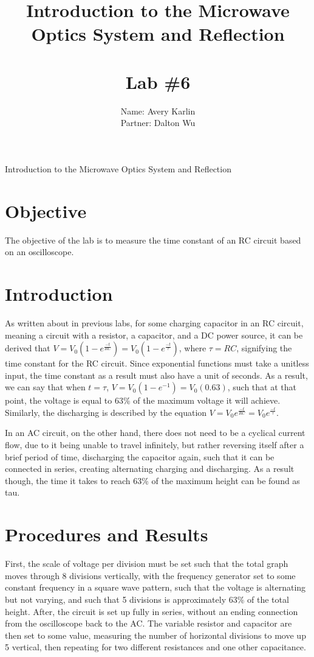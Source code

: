 \documentclass[11pt, titlepage]{article}
\title{Introduction to the Microwave Optics System and Reflection \\ \ \\ \large Lab \#6}
\author{Name: Avery Karlin \\ Partner: Dalton Wu}
\date{}
\begin{document}
\maketitle

\begin{center}
\LARGE Introduction to the Microwave Optics System and Reflection
\end{center}

\section*{Objective}
The objective of the lab is to measure the time constant of an RC circuit based on an oscilloscope.

\section*{Introduction}
As written about in previous labs, for some charging capacitor in an RC circuit, meaning a circuit with a resistor, a capacitor, and a DC power source, it can be derived that $V = V_0(1 - e^{\frac{-t}{RC}}) = V_0(1 - e^{\frac{-t}{\tau}})$, where $\tau = RC$, signifying the time constant for the RC circuit. Since exponential functions must take a unitless input, the time constant as a result must also have a unit of seconds. As a result, we can say that when $t = \tau$, $V = V_0(1 - e^{-1}) = V_0(0.63)$, such that at that point, the voltage is equal to 63\% of the maximum voltage it will achieve. Similarly, the discharging is described by the equation $V = V_0e^{\frac{-t}{RC}} = V_0e^{\frac{-t}{\tau}}$.

In an AC circuit, on the other hand, there does not need to be a cyclical current flow, due to it being unable to travel infinitely, but rather reversing itself after a brief period of time, discharging the capacitor again, such that it can be connected in series, creating alternating charging and discharging. As a result though, the time it takes to reach 63\% of the maximum height can be found as tau.

\section*{Procedures and Results}

First, the scale of voltage per division must be set such that the total graph moves through 8 divisions vertically, with the frequency generator set to some constant frequency in a square wave pattern, such that the voltage is alternating but not varying, and such that 5 divisions is approximately 63\% of the total height. After, the circuit is set up fully in series, without an ending connection from the oscilloscope back to the AC. The variable resistor and capacitor are then set to some value, measuring the number of horizontal divisions to move up 5 vertical, then repeating for two different resistances and one other capacitance. 
\end{document}
